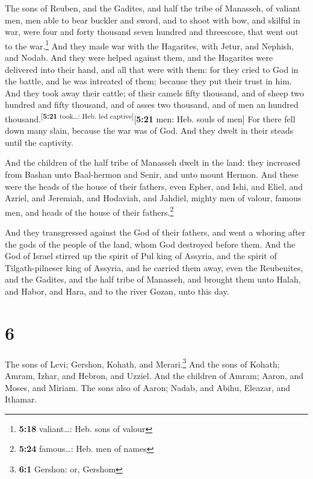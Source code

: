  The sons of Reuben, and the Gadites, and half the tribe
of Manasseh, of valiant men, men able to bear buckler and sword, and to
shoot with bow, and skilful in war, were four and forty thousand seven
hundred and threescore, that went out to the war.\footnote{\textbf{5:18}
  valiant\ldots: Heb. sons of valour}  And they made war
with the Hagarites, with Jetur, and Nephish, and Nodab. 
And they were helped against them, and the Hagarites were delivered into
their hand, and all that were with them: for they cried to God in the
battle, and he was intreated of them; because they put their trust in
him.  And they took away their cattle; of their camels
fifty thousand, and of sheep two hundred and fifty thousand, and of
asses two thousand, and of men an hundred
thousand.\textsuperscript{{[}\textbf{5:21} took\ldots: Heb. led
captive{]}}{[}\textbf{5:21} men: Heb. souls of men{]} 
For there fell down many slain, because the war was of God. And they
dwelt in their steads until the captivity.

 And the children of the half tribe of Manasseh dwelt in
the land: they increased from Bashan unto Baal-hermon and Senir, and
unto mount Hermon.  And these were the heads of the house
of their fathers, even Epher, and Ishi, and Eliel, and Azriel, and
Jeremiah, and Hodaviah, and Jahdiel, mighty men of valour, famous men,
and heads of the house of their fathers.\footnote{\textbf{5:24}
  famous\ldots: Heb. men of names}

 And they transgressed against the God of their fathers,
and went a whoring after the gods of the people of the land, whom God
destroyed before them.  And the God of Israel stirred up
the spirit of Pul king of Assyria, and the spirit of Tilgath-pilneser
king of Assyria, and he carried them away, even the Reubenites, and the
Gadites, and the half tribe of Manasseh, and brought them unto Halah,
and Habor, and Hara, and to the river Gozan, unto this day.

\hypertarget{section-5}{%
\section{6}\label{section-5}}

 The sons of Levi; Gershon, Kohath, and Merari.\footnote{\textbf{6:1}
  Gershon: or, Gershom}  And the sons of Kohath; Amram,
Izhar, and Hebron, and Uzziel.  And the children of Amram;
Aaron, and Moses, and Miriam. The sons also of Aaron; Nadab, and Abihu,
Eleazar, and Ithamar.

